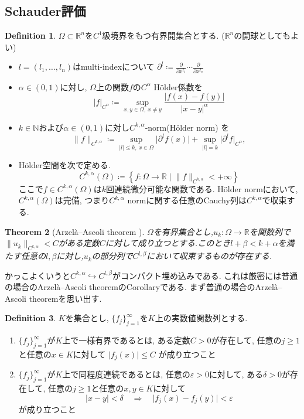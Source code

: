 \documentclass[dvipdfmx,a4paper,11pt]{article} %
\newtheorem{thm}{Theorem}[section]
\theoremstyle{definition}
\newtheorem{defn}[thm]{Definition}
\theoremstyle{remark}
\numberwithin{equation}{section}
\newcommand{\R}{\mathbb{R}}
\begin{document}
\subsection{Schauder評価}


\begin{defn}
\label{defn-Holder}
 $\Omega\subset\mathbb{R}^n$を$C^1$級境界をもつ有界開集合とする. ($\mathbb{R}^n$の開球としてもよい)
 \begin{itemize}
 \item  $l=(l_1,\ldots,l_n)$はmulti-indexについて
\(
\partial^l\coloneqq \frac{\partial}{\partial x^{l_1}}\cdots\frac{\partial}{\partial x^{l_n}}
\)
 \item $\alpha\in(0,1)$に対し, $\Omega$上の関数$f$の$C^\alpha$ H\"older係数を
\[
\lvert f\rvert_{C^\alpha}\coloneqq \sup_{x,y\in\Omega,\ x\ne y}\frac{\lvert f(x)-f(y)\rvert}{\lvert x-y\rvert^\alpha}
\]
\item $k\in\mathbb{N}$および$\alpha\in(0,1)$に対し$C^{k,\alpha}$-norm(H\"older norm) を
\[
\lVert f\rVert_{C^{k,\alpha}}
\coloneqq \sup_{\lvert l\rvert\leq k,\ x\in\Omega}\lvert\partial^l f(x)\rvert
+\sup_{\lvert l\rvert=k}\lvert\partial^l f\rvert_{C^\alpha},
\]
\item H\"older空間を次で定める. 
\[
C^{k,\alpha}(\Omega)
\coloneqq \left\{
f  \colon \Omega \to \R \mid  \lVert f\rVert_{C^{k,\alpha}} < + \infty\right\}
\]
ここで$f \in C^{k,\alpha}(\Omega)$は$k$回連続微分可能な関数である. H\"older normにおいて, $C^{k,\alpha}(\Omega)$は完備, つまり$C^{k,\alpha}$ normに関する任意のCauchy列は$C^{k,\alpha}$で収束する. 
 \end{itemize}
\end{defn}

\begin{thm}[Arzel\`a--Ascoli theorem {\cite[Theorem 2.6]{Sze14}}]
\label{thm-Arzela-Ascoli}
$\Omega$を有界集合とし,$u_k\colon \Omega\to\mathbb{R}$を関数列で$\lVert u_k\rVert_{C^{k,\alpha}}<C$がある定数$C$に対して成り立つとする.このとき$l+\beta<k+\alpha$を満たす任意の$l,\beta$に対し,$u_k$の部分列で$C^{l,\beta}$において収束するものが存在する.
\end{thm}
かっこよくいうと$C^{k, \alpha} \hookrightarrow C^{l, \beta}$がコンパクト埋め込みである. 
これは厳密には普通の場合のArzel\`a--Ascoli theoremのCorollaryである. まず普通の場合のArzel\`a--Ascoli theoremを思い出す. 
\begin{defn}
$K$を集合とし, $\{f_j\}_{j=1}^{\infty}$を$K$上の実数値関数列とする.
\begin{enumerate}
\item $\{f_j\}_{j=1}^{\infty}$が$K$上で一様有界であるとは, ある定数$C>0$が存在して, 任意の$j\geq 1$と任意の$x\in K$に対して
\(
  \lvert f_j(x)\rvert\leq C
\)
が成り立つこと
\item $\{f_j\}_{j=1}^{\infty}$が$K$上で同程度連続であるとは, 任意の$\varepsilon>0$に対して, ある$\delta>0$が存在して, 任意の$j\geq 1$と任意の$x,y\in K$に対して
\[
  \lvert x-y\rvert<\delta
  \quad\Longrightarrow\quad
  \lvert f_j(x)-f_j(y)\rvert<\varepsilon
\]
が成り立つこと
\end{enumerate}
\end{defn}
\end{document}
